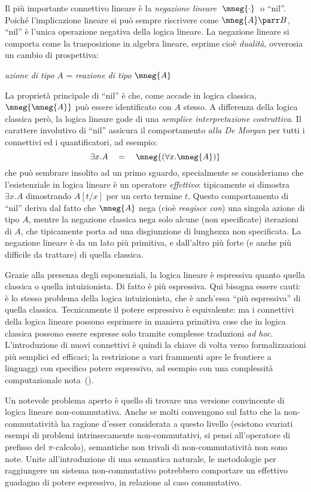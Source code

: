 \documentclass[12pt,a4paper,openright,twoside]{report}
\begin{document}
Il pi\`u importante connettivo lineare \`e la \emph{negazione lineare} $\;\mneg{\cdot}\;$ o ``nil''. Poich\'e l'implicazione lineare si pu\`o sempre riscrivere come $\mneg{A} \parr B$, ``nil'' \`e l'unica operazione negativa della logica lineare. La negazione lineare si comporta come la trasposizione in algebra lineare, esprime cio\`e \emph{dualit\`a}, ovverosia un cambio di prospettiva:
\begin{center}
	\emph{azione di tipo} $A$ = \emph{reazione di tipo} $\mneg{A}$
\end{center}
La propriet\`a principale di ``nil'' \`e che, come accade in logica classica, $\mneg{\mneg{A}}$ pu\`o essere identificato con $A$ stesso. A differenza della logica classica per\`o, la logica lineare gode di una \emph{semplice interpretazione costruttiva}. Il carattere involutivo di ``nil'' assicura il comportamento \emph{alla De Morgan} per tutti i connettivi ed i quantificatori, ad esempio:
$$
	\exists x.A \quad=\quad \mneg{(\forall x.\mneg{A})}
$$
che pu\`o sembrare insolito ad un primo sguardo, specialmente se consideriamo che l'esistenziale in logica lineare \`e un operatore \emph{effettivo}: tipicamente si dimostra $\exists x.A$ dimostrando $A[t/x]$ per un certo termine $t$. Questo comportamento di ``nil'' deriva dal fatto che $\mneg{A}$ nega (cio\`e \emph{reagisce con}) una singola azione di tipo $A$, mentre la negazione classica nega solo alcune (non specificate) iterazioni di $A$, che tipicamente porta ad una disgiunzione di lunghezza non specificata. La negazione lineare \`e da un lato pi\`u primitiva, e dall'altro pi\`u forte (e anche pi\`u difficile da trattare) di quella classica.


Grazie alla presenza degli esponenziali, la logica lineare \`e espressiva quanto quella classica o quella intuizionista. Di fatto \`e pi\`u espressiva. Qui bisogna essere cauti: \`e lo stesso problema della logica intuizionista, che \`e anch'essa ``pi\`u espressiva'' di quella classica. Tecnicamente il potere espressivo \`e equivalente: ma i connettivi della logica lineare possono esprimere in maniera primitiva cose che in logica classica possono essere espresse solo tramite complesse traduzioni \emph{ad hoc}. L'introduzione di nuovi connettivi \`e quindi la chiave di volta verso formalizzazioni pi\`u semplici ed efficaci; la restrizione a vari frammenti apre le frontiere a linguaggi con specifico potere espressivo, ad esempio con una complessit\`a computazionale nota~(\cite{Gir98, Laf02, DalBai06}).

Un notevole problema aperto \`e quello di trovare una versione convincente di logica lineare non-commutativa. Anche se molti convengono sul fatto che la non-commutativit\`a ha ragione d'esser considerata a questo livello (esistono svariati esempi di problemi intrinsecamente non-commutativi, si pensi all'operatore di prefisso del $\pi$-calcolo), semantiche non trivali di non-commutativit\`a non sono note. Unite all'introduzione di una semantica naturale, le metodologie per raggiungere un sistema non-commutativo potrebbero comportare un effettivo guadagno di potere espressivo, in relazione al caso commutativo.
\end{document}
